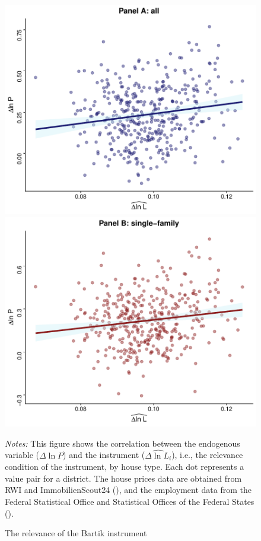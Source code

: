 \documentclass[
  12pt,
]{article}
\begin{document}
\begin{figure}[H]
\centering

\begin{center}\includegraphics[width=0.49\linewidth]{output/figs/first-stage-1} \includegraphics[width=0.49\linewidth]{output/figs/first-stage-2} \end{center}

\caption{The relevance of the Bartik instrument}\label{fig:first-stage}
\medskip
\begin{minipage}{0.9\textwidth}
\footnotesize
\textit{Notes:} This figure shows the correlation between the endogenous variable ($\Delta\ln P$) and the instrument ($\widehat{\Delta\ln L_i}$), i.e., the relevance condition of the instrument, by house type. Each dot represents a value pair for a district. The house prices data are obtained from RWI and ImmobilienScout24 (), and the employment data from the Federal Statistical Office and Statistical Offices of the Federal States ().
\end{minipage}
\end{figure}
\end{document}
